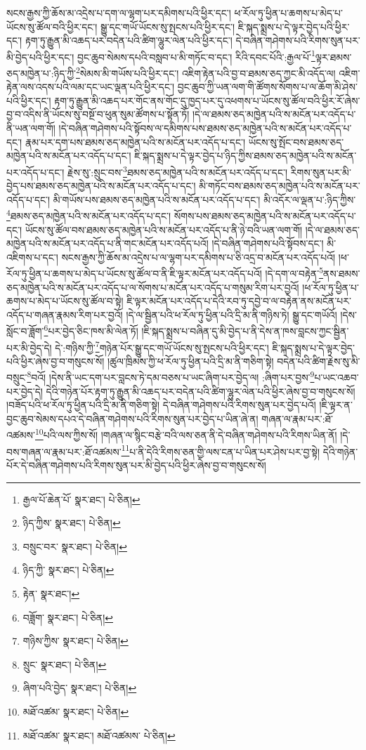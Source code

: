 སངས་རྒྱས་ཀྱི་ཆོས་མ་འདྲེས་པ་དག་ལ་ལྷག་པར་དམིགས་པའི་ཕྱིར་དང་། ཕ་རོལ་ཏུ་ཕྱིན་པ་ཆགས་པ་མེད་པ་ཡོངས་སུ་ཚོལ་བའི་ཕྱིར་དང་། སྒྱུ་དང་གཡོ་ཡོངས་སུ་སྤངས་པའི་ཕྱིར་དང་། ཇི་སྐད་སྨྲས་པ་དེ་ལྟར་བྱེད་པའི་ཕྱིར་དང་། རྟག་ཏུ་རྒྱུན་མི་འཆད་པར་བདེན་པའི་ཚིག་ལྷུར་ལེན་པའི་ཕྱིར་དང་། དེ་བཞིན་གཤེགས་པའི་རིགས་སུན་པར་མི་བྱེད་པའི་ཕྱིར་དང་། བྱང་ཆུབ་སེམས་དཔའི་བསླབ་པ་མི་གཏོང་བ་དང་། རིའི་དབང་པོའི་:རྒྱལ་པོ་\footnote{རྒྱལ་པོ་ཆེན་པོ་  སྣར་ཐང་།  པེ་ཅིན། }ལྟར་ཐམས་ཅད་མཁྱེན་པ་:ཉིད་ཀྱི་\footnote{ཉིད་ཀྱིས་  སྣར་ཐང་།  པེ་ཅིན། }སེམས་མི་གཡོས་པའི་ཕྱིར་དང་། འཇིག་རྟེན་པའི་བྱ་བ་ཐམས་ཅད་ཀྱང་མི་འདོད་ལ། འཇིག་རྟེན་ལས་འདས་པའི་ལམ་དང་ཡང་ལྡན་པའི་ཕྱིར་དང་། བྱང་ཆུབ་ཀྱི་ཡན་ལག་གི་ཚོགས་སོགས་པ་ལ་ཆོག་མི་ཤེས་པའི་ཕྱིར་དང་། རྟག་ཏུ་རྒྱུན་མི་འཆད་པར་གོང་ནས་གོང་དུ་ཁྱད་པར་དུ་འཕགས་པ་ཡོངས་སུ་ཚོལ་བའི་ཕྱིར་རོ་ཞེས་བྱ་བ་འདིས་ནི་ཡོངས་སུ་བསྔོ་བ་ཕུན་སུམ་ཚོགས་པ་སྟོན་ཏོ། །དེ་ལ་ཐམས་ཅད་མཁྱེན་པའི་ས་མངོན་པར་འདོད་པ་ནི་ཡན་ལག་གོ། །དེ་བཞིན་གཤེགས་པའི་སྟོབས་ལ་དམིགས་པས་ཐམས་ཅད་མཁྱེན་པའི་ས་མངོན་པར་འདོད་པ་དང་། རྣམ་པར་དག་པས་ཐམས་ཅད་མཁྱེན་པའི་ས་མངོན་པར་འདོད་པ་དང་། ཡོངས་སུ་སྤོང་བས་ཐམས་ཅད་མཁྱེན་པའི་ས་མངོན་པར་འདོད་པ་དང་། ཇི་སྐད་སྨྲས་པ་དེ་ལྟར་བྱེད་པ་ཉིད་ཀྱིས་ཐམས་ཅད་མཁྱེན་པའི་ས་མངོན་པར་འདོད་པ་དང་། རྗེས་སུ་:སྲུང་བས་\footnote{བསྲུང་བར་  སྣར་ཐང་།  པེ་ཅིན། }ཐམས་ཅད་མཁྱེན་པའི་ས་མངོན་པར་འདོད་པ་དང་། རིགས་སུན་པར་མི་བྱེད་པས་ཐམས་ཅད་མཁྱེན་པའི་ས་མངོན་པར་འདོད་པ་དང་། མི་གཏོང་བས་ཐམས་ཅད་མཁྱེན་པའི་ས་མངོན་པར་འདོད་པ་དང་། མི་གཡོས་པས་ཐམས་ཅད་མཁྱེན་པའི་ས་མངོན་པར་འདོད་པ་དང་། མི་འདོར་ལ་ལྡན་པ་:ཉིད་ཀྱིས་\footnote{ཉིད་ཀྱི་  སྣར་ཐང་།  པེ་ཅིན། }ཐམས་ཅད་མཁྱེན་པའི་ས་མངོན་པར་འདོད་པ་དང་། སོགས་པས་ཐམས་ཅད་མཁྱེན་པའི་ས་མངོན་པར་འདོད་པ་དང་། ཡོངས་སུ་ཚོལ་བས་ཐམས་ཅད་མཁྱེན་པའི་ས་མངོན་པར་འདོད་པ་ནི་ཉེ་བའི་ཡན་ལག་གོ། །དེ་ལ་ཐམས་ཅད་མཁྱེན་པའི་ས་མངོན་པར་འདོད་པ་ནི་གང་མངོན་པར་འདོད་པའོ། །དེ་བཞིན་གཤེགས་པའི་སྟོབས་དང་། མི་འཇིགས་པ་དང་། སངས་རྒྱས་ཀྱི་ཆོས་མ་འདྲེས་པ་ལ་ལྷག་པར་དམིགས་པ་ཅི་འདྲ་བ་མངོན་པར་འདོད་པའོ། །ཕ་རོལ་ཏུ་ཕྱིན་པ་ཆགས་པ་མེད་པ་ཡོངས་སུ་ཚོལ་བ་ནི་ཇི་ལྟར་མངོན་པར་འདོད་པའོ། །དེ་དག་ལ་བརྟེན་\footnote{རྟེན་  སྣར་ཐང་། }ནས་ཐམས་ཅད་མཁྱེན་པའི་ས་མངོན་པར་འདོད་པ་ལ་སོགས་པ་མངོན་པར་འདོད་པ་གསུམ་རིག་པར་བྱའོ། །ཕ་རོལ་ཏུ་ཕྱིན་པ་ཆགས་པ་མེད་པ་ཡོངས་སུ་ཚོལ་བ་སྟེ། ཇི་ལྟར་མངོན་པར་འདོད་པ་དེའི་རབ་ཏུ་དབྱེ་བ་ལ་བརྟེན་ནས་མངོན་པར་འདོད་པ་གཞན་རྣམས་རིག་པར་བྱའོ། །དེ་ལ་སྦྱིན་པའི་ཕ་རོལ་ཏུ་ཕྱིན་པའི་དྲི་མ་ནི་གཉིས་ཏེ། སྒྱུ་དང་གཡོའོ། །དེས་སློང་བ་ཟློག་\footnote{བཟློག་  སྣར་ཐང་།  པེ་ཅིན། }པར་བྱེད་ཅིང་ཁས་མི་ལེན་ཏོ། །ཇི་སྐད་སྨྲས་པ་བཞིན་དུ་མི་བྱེད་པ་ནི་དེས་ན་ཁས་བླངས་ཀྱང་སྦྱིན་པར་མི་བྱེད་དེ། དེ་:གཉིས་ཀྱི་\footnote{གཉིས་ཀྱིས་  སྣར་ཐང་།  པེ་ཅིན། }གཉེན་པོར་སྒྱུ་དང་གཡོ་ཡོངས་སུ་སྤངས་པའི་ཕྱིར་དང་། ཇི་སྐད་སྨྲས་པ་དེ་ལྟར་བྱེད་པའི་ཕྱིར་ཞེས་བྱ་བ་གསུངས་སོ། །ཚུལ་ཁྲིམས་ཀྱི་ཕ་རོལ་ཏུ་ཕྱིན་པའི་དྲི་མ་ནི་གཅིག་སྟེ། བདེན་པའི་ཚིག་རྗེས་སུ་མི་བསྲུང་\footnote{སྲུང་  སྣར་ཐང་།  པེ་ཅིན། }བའོ། །དེས་ནི་ཡང་དག་པར་བླངས་ཏེ་དམ་བཅས་པ་ཡང་ཞིག་པར་བྱེད་ལ། :ཞིག་པར་བྱས་\footnote{ཞིག་པའི་བྱེད་  སྣར་ཐང་།  པེ་ཅིན། }པ་ཡང་འཆབ་པར་བྱེད་དེ། དེའི་གཉེན་པོར་རྟག་ཏུ་རྒྱུན་མི་འཆད་པར་བདེན་པའི་ཚིག་ལྷུར་ལེན་པའི་ཕྱིར་ཞེས་བྱ་བ་གསུངས་སོ། །བཟོད་པའི་ཕ་རོལ་ཏུ་ཕྱིན་པའི་དྲི་མ་ནི་གཅིག་སྟེ། དེ་བཞིན་གཤེགས་པའི་རིགས་སུན་པར་བྱེད་པའོ། །ཇི་ལྟར་ན་བྱང་ཆུབ་སེམས་དཔའ་དེ་བཞིན་གཤེགས་པའི་རིགས་སུན་པར་བྱེད་པ་ཡིན་ཞེ་ན། གཞན་ལ་རྣམ་པར་:ཐོ་འཚམས་\footnote{མཐོ་འཚམ་  སྣར་ཐང་།  པེ་ཅིན། }པའི་ལས་ཀྱིས་སོ། །གཞན་ལ་སྙིང་བརྩེ་བའི་ལས་ཅན་ནི་དེ་བཞིན་གཤེགས་པའི་རིགས་ཡིན་ནོ། །དེ་བས་གཞན་ལ་རྣམ་པར་:ཐོ་འཚམས་\footnote{མཐོ་འཚམ་  སྣར་ཐང་། མཐོ་འཚམས་  པེ་ཅིན། }པ་ནི་དེའི་རིགས་ཅན་གྱི་ལས་ངན་པ་ཡིན་པར་ཤེས་པར་བྱ་སྟེ། དེའི་གཉེན་པོར་དེ་བཞིན་གཤེགས་པའི་རིགས་སུན་པར་མི་བྱེད་པའི་ཕྱིར་ཞེས་བྱ་བ་གསུངས་སོ། 